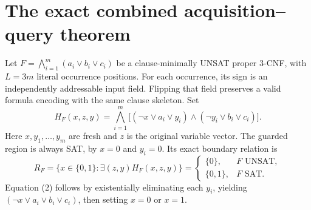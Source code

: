 \documentclass[11pt]{article}
\begin{document}
\section{The exact combined acquisition--query theorem}
Let $F=\bigwedge_{i=1}^m(a_i\vee b_i\vee c_i)$ be a clause-minimally UNSAT proper 3-CNF, with $L=3m$ literal occurrence positions. For each occurrence, its sign is an independently addressable input field. Flipping that field preserves a valid formula encoding with the same clause skeleton. Set
\[
H_F(x,z,y)=\bigwedge_{i=1}^m \big[(\neg x\vee a_i\vee y_i)\land(\neg y_i\vee b_i\vee c_i)\big].\tag{1}
\]
Here $x,y_1,\ldots,y_m$ are fresh and $z$ is the original variable vector. The guarded region is always SAT, by $x=0$ and $y_i=0$. Its exact boundary relation is
\[
R_F=\{x\in\{0,1\}:\exists(z,y)H_F(x,z,y)\}=\begin{cases}\{0\},&F\text{ UNSAT},\\\{0,1\},&F\text{ SAT}.\end{cases}\tag{2}
\]
Equation (2) follows by existentially eliminating each $y_i$, yielding $(\neg x\vee a_i\vee b_i\vee c_i)$, then setting $x=0$ or $x=1$.
\end{document}
